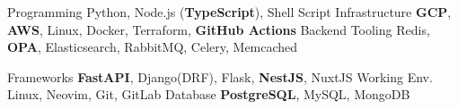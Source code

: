 

\begin{minipage}[t]{\dimexpr(\linewidth/2) - 3em}
  \vspace{-0.8em}
  \begin{cvskills}
    \cvskill
      {Programming}
      {Python, Node.js (\textbf{TypeScript}), Shell Script}
    \cvskill
      {Infrastructure}
      {\textbf{GCP}, \textbf{AWS}, Linux, Docker, Terraform, \textbf{GitHub Actions}}
    \cvskill
      {Backend Tooling}
      {Redis, \textbf{OPA}, Elasticsearch, RabbitMQ, Celery, Memcached}
  \end{cvskills}
\end{minipage}
\hfill
\begin{minipage}[t]{\dimexpr(\linewidth/2) - 3em}
  \vspace{-0.8em}
  \begin{cvskills}
    \cvskill
      {Frameworks}
      {\textbf{FastAPI}, Django(DRF), Flask, \textbf{NestJS}, NuxtJS}
    \cvskill
      {Working Env.}
      {Linux, Neovim, Git, GitLab}
    \cvskill
      {Database}
      {\textbf{PostgreSQL}, MySQL, MongoDB}
  \end{cvskills}
\end{minipage}
